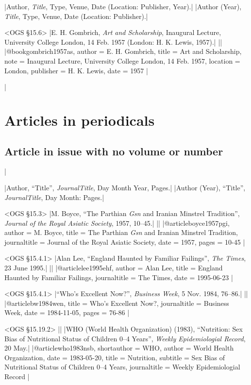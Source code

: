 \documentclass[extrafontsizes,11pt,a4paper,oneside]{memoir}
\begin{document}
\specs
|Author, \emph{Title}, Type, Venue, Date (Location: Publisher, Year).|%
|Author (Year), \emph{Title}, Type, Venue, Date (Location: Publisher).|

\bibexample<OGS \S15.6>
|E. H. Gombrich, \emph{Art and Scholarship}, Inaugural Lecture, University College London, 14 Feb. 1957 (London: H. K. Lewis, 1957).|%
||%
|@book{gombrich1957as,
  author = {E. H. Gombrich},
  title = {Art and Scholarship},
  note = {Inaugural Lecture, University College London, 14 Feb. 1957},
  location = {London},
  publisher = {H. K. Lewis},
  date = {1957}
}|

\todoc|
\chapter{Articles in periodicals}\label{sec:article}

\section{Article in issue with no volume or number}
|

\specs
|Author, \enquote{Title}, \emph{JournalTitle}, Day Month Year, Pages.|%
|Author (Year), \enquote{Title}, \emph{JournalTitle}, Day Month: Pages.|

\bibexample<OGS \S15.3>
|M. Boyce, \enquote{The Parthian \emph{Gsn} and Iranian Minstrel Tradition}, \emph{Journal of the Royal Asiatic Society}, 1957, 10--45.|%
||%
|@article{boyce1957pgi,
  author = {M. Boyce},
  title = {The Parthian \emph{Gsn} and Iranian Minstrel Tradition},
  journaltitle = {Journal of the Royal Asiatic Society},
  date = {1957},
  pages = {10-45}
}|

\bibexample<OGS \S15.4.1>
|Alan Lee, \enquote{England Haunted by Familiar Failings}, \emph{The Times}, 23 June 1995.|%
||%
|@article{lee1995ehf,
  author = {Alan Lee},
  title = {England Haunted by Familiar Failings},
  journaltitle = {The Times},
  date = {1995-06-23}
}|

\bibexample<OGS \S15.4.1>
|\enquote{Who's Excellent Now?}, \emph{Business Week}, 5 Nov. 1984, 76--86.|%
||%
|@article{bw1984wen,
  title = {Who's Excellent Now?},
  journaltitle = {Business Week},
  date = {1984-11-05},
  pages = {76-86}
}|

\bibexample<OGS \S15.19.2>
||%
|WHO (World Health Organization) (1983), \enquote{Nutrition: Sex Bias of Nutritional Status of Children 0–4 Years}, \emph{Weekly Epidemiologial Record}, 20 May.|%
|@article{who1983nsb,
  shortauthor = {WHO},
  author = {{World Health Organization}},
  date = {1983-05-20},
  title = {Nutrition},
  subtitle = {Sex Bias of Nutritional Status of Children 0–4 Years},
  journaltitle = {Weekly Epidemiologial Record}
}|
\end{document}

